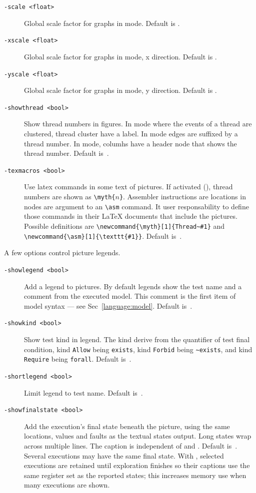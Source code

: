 \begin{description}
\item[{\tt -scale <float>}]
Global scale factor for graphs in  mode.
Default is .
\item[{\tt -xscale <float>}]
Global scale factor for graphs in  mode, x direction.
Default is .
\item[{\tt -yscale <float>}]
Global scale factor for graphs in  mode, y direction.
Default is .
\item[{\tt -showthread <bool>}] Show thread numbers in figures.
In  mode where the events of a thread are clustered,
thread cluster have a label.
In  mode  edges are suffixed by a thread number.
In  mode,  columhs have a header node that shows
the thread number. Default is~.
\item[{\tt -texmacros <bool>}] Use latex commands in some text of pictures.
If activated (), thread numbers are shown as
\verb+\myth{+$n$\verb+}+. Assembler instructions are locations in nodes
are argument to an \verb+\asm+ command. It user responsability to define
those commands in their \LaTeX{} documents that include the pictures.
Possible definitions are \verb+\newcommand{\myth}[1]{Thread~#1}+
and \verb+\newcommand{\asm}[1]{\texttt{#1}}+.
Default is~.
\end{description}

A few options control picture legends.
\begin{description}
\item[{\tt -showlegend <bool>}]
Add a legend to pictures. By default legends show the test name and
a comment from the executed model.
This comment is the first item
of model syntax  --- see Sec~\ref{language:model}.
Default is~.
\item[{\tt -showkind <bool>}]
Show test kind in legend.
The kind derive from the quantifier of test final condition,
kind \texttt{Allow} being \verb+exists+,
kind \texttt{Forbid} being \verb+~exists+,
and kind \texttt{Require} being \verb+forall+.
Default is~.
\item[{\tt -shortlegend <bool>}]
Limit legend to test name. Default is~.
\item[{\tt -showfinalstate <bool>}]
Add the execution's final state beneath the picture, using the same
locations, values and faults as the textual states output.
Long states wrap across multiple lines. The caption is independent of
 and . Default is~.
Several executions may have the same final state.
With , selected executions are retained until
exploration finishes so their captions use the same register set as the
reported states; this increases memory use when many executions are shown.
\end{description}

